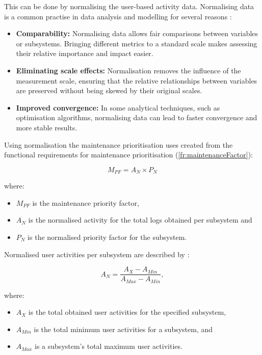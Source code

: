 This can be done by normalising the user-based activity data. Normalising data is a common practise in data analysis and modelling for several reasons \cite{Patro2015}:

\begin{itemize}
    \item \textbf{Comparability:} Normalising data allows fair comparisons between variables or subsystems. Bringing different metrics to a standard scale makes assessing their relative importance and impact easier.

    \item \textbf{Eliminating scale effects:} Normalisation removes the influence of the measurement scale, ensuring that the relative relationships between variables are preserved without being skewed by their original scales.

    \item \textbf{Improved convergence:} In some analytical techniques, such as optimisation algorithms, normalising data can lead to faster convergence and more stable results.
\end{itemize}

Using normalisation the maintenance prioritisation uses  created from the functional requirements for maintenance prioritisation (\ref{fr:maintenanceFactor}):

\begin{equation}
	\label{eq:ch2_maintenanceFactorSimplified}
	M_{PF} = A_{N} \times P_{N}
\end{equation}

where:

\begin{itemize}
	\item $M_{PF}$ is the maintenance priority factor,
	\item $A_{N}$ is the normalised activity for the total logs obtained per subsystem and
	\item $P_{N}$ is the normalised priority factor for the subsystem.
\end{itemize}

Normalised user activities per subsystem are described by :

\begin{equation}
	\label{eq:ch2_eventNormalised}
	A_{N} = \frac{A_X - A_{Min}}{A_{Max} - A_{Min}},
\end{equation}

where:

\begin{itemize}
	\item $A_X$ is the total obtained user activities for the specified subsystem,
	\item $A_{Min}$ is the total minimum user activities for a subsystem, and
	\item $A_{Max}$ is a subsystem's total maximum user activities.
\end{itemize}

